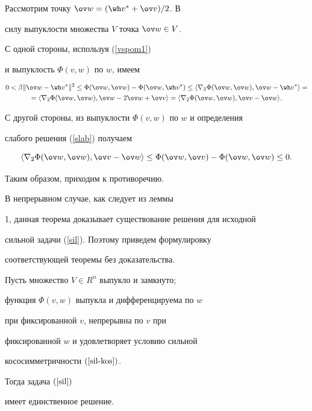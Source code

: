 \begin{pf}
Рассмотрим точку $\ov w=(\wh v^* + \ov v)/2$. В


силу выпуклости множества $V$ точка $\ov w\in V$.





С одной стороны, используя (\ref{vspom1}) 


и выпуклость $\Phi(v,w)$ по $w$, имеем


\begin{multline*}


0 < \beta \| \ov w - \wh v^* \|^2 \leq \Phi(\ov w, \ov w) -


\Phi(\ov w, \wh v^*)


\leq \langle \nabla_2 \Phi(\ov w, \ov w), \ov w - \wh v^* \rangle =\\


%


= \langle \nabla_2 \Phi(\ov w, \ov w), \ov w - 2 \ov w + \ov v \rangle


= \langle \nabla_2 \Phi(\ov w, \ov w), \ov v - \ov w \rangle.


\end{multline*}


С другой стороны, из выпуклости $\Phi(v,w)$ по $w$ и определения


слабого решения (\ref{slab}) получаем


$$


\langle \nabla_2 \Phi(\ov w,\ov w), \ov v - \ov w\rangle \leq


\Phi(\ov w,\ov v) - \Phi(\ov w, \ov w) \leq 0.


$$


Таким образом, приходим к противоречию.


\end{pf}





В непрерывном случае, как следует из леммы


1, данная теорема доказывает существование решения для исходной


сильной задачи (\ref{sil}). Поэтому приведем формулировку


соответствующей теоремы без доказательства.





\begin{thm}\label{th-exsil}


Пусть множество $V\in R^n$ выпукло и замкнуто$;$


функция $\Phi(v,w)$ выпукла и дифференцируема по $w$


при фиксированной $v$, непрерывна по $v$ при 


фиксированной $w$ и удовлетворяет условию сильной 


кососимметричности $(\ref{sil-kos})$.


Тогда задача $(\ref{sil})$


 имеет единственное решение.


\end{thm}





